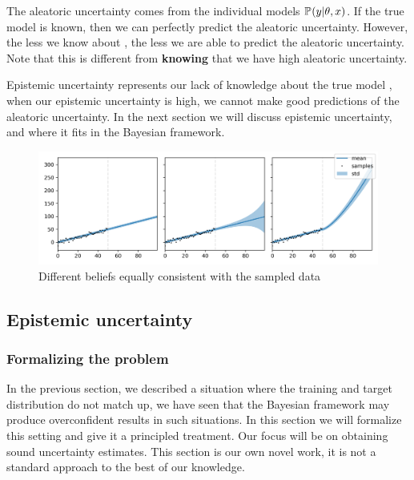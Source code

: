 \documentclass[../main.tex]{subfiles}
\begin{document}
The aleatoric uncertainty comes from the individual models $\mathbb{P}_{}(y|\theta, x)$. If the true model  is known, then we can perfectly predict the aleatoric uncertainty. However, the less we know about , the less we are able to predict the aleatoric uncertainty. Note that this is different from \textbf{knowing} that we have high aleatoric uncertainty. 

Epistemic uncertainty represents our lack of knowledge about the true model , when our epistemic uncertainty is high, we cannot make good predictions of the aleatoric uncertainty. In the next section we will discuss epistemic uncertainty, and where it fits in the Bayesian framework. 

\begin{figure}
    \centering
    \includegraphics[width=1\textwidth]{Background/uncertainty_beliefs.png}
    \caption{Different beliefs equally consistent with the sampled data}
    \label{fig:uncertainty_toy}
\end{figure}

\subsection{Epistemic uncertainty}
\label{sec:epistemic}


\subsubsection{Formalizing the problem}
\label{sec:formalizing}

In the previous section, we described a situation where the training and target distribution do not match up, we have seen that the Bayesian framework may produce overconfident results in such situations. In this section we will formalize this setting and give it a principled treatment. Our focus will be on obtaining sound uncertainty estimates. This section is our own novel work, it is not a standard approach to the best of our knowledge. 
\end{document}
